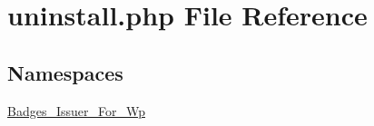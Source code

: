 \hypertarget{uninstall_8php}{}\section{uninstall.\+php File Reference}
\label{uninstall_8php}
\subsection*{Namespaces}
\begin{DoxyCompactItemize}
\item 
 \hyperlink{namespace_badges___issuer___for___wp}{Badges\+\_\+\+Issuer\+\_\+\+For\+\_\+\+Wp}
\end{DoxyCompactItemize}
